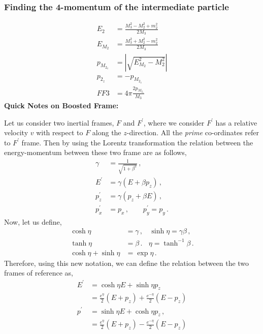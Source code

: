 \documentclass[12pt]{article}
\begin{document}
{\subsubsection{Finding the 4-momentum of the intermediate particle}
{\color{blue}
\begin{align}
    E_2 &= \frac{M_3^2 - M_2^2 + m_2^2}{2M_3} \\
    E_{M_2} &= \frac{M_3^2 + M_2^2 - m_2^2}{2M_3} \\
    p_{M_{2_z}} &= |\sqrt{E_{M_2}^2 - M_2^2} |\\
     p_{2_z} &= -  p_{M_{2_z}} \\
     FF3 &= 4 \pi \frac{2 p_{M_{2_z}}}{M_3}
\end{align}
\textbf{Quick Notes on Boosted Frame:}

Let us consider two inertial frames, $F$ and $F^\prime$, where we consider $F^\prime$ has a relative velocity $v$ with respect to $F$ along the $z$-direction. All the \textit{prime} co-ordinates refer to $F^\prime$ frame. Then by using the Lorentz transformation the relation between the energy-momentum between these two frame are as follows,
\begin{align}
    \gamma &= \frac{1}{\sqrt{1+\beta^2}} \,,\\
    E^\prime &= \gamma (E + \beta p_z) \,, \\
    p^\prime _z &= \gamma (p_z + \beta E)\,, \\
    p^\prime_x &=  p_x \,,~~~~~~~~~ p^\prime_y = p_y \,.
\end{align}
Now, let us define,
\begin{align}
    \cosh{\eta} &= \gamma \,, ~~~~ \sinh{\eta} = \gamma \beta \,,\\
    \tanh{\eta} &= \beta \,. ~~~~ \eta = \tanh^{-1}{\beta} \,.\\
    \cosh{\eta} + \sinh{\eta} &= \exp{\eta} \,.
\end{align}
Therefore, using this new notation, we can define the relation between the two frames of reference as,
\begin{align}
\label{Eq:boosted_energy}
    E^\prime &= \cosh{\eta} E + \sinh{\eta} p_z \, \\
             &= \frac{e^\eta}{2} (E + p_z) + \frac{e^{-\eta}}{2} (E - p_z) \nonumber \\
    p^\prime &= \sinh{\eta} E + \cosh{\eta} p_z \,, \\
    \label{Eq:boosted_momentum}
             &= \frac{e^\eta}{2} (E + p_z) - \frac{e^{-\eta}}{2} (E - p_z)
\end{align}
}}
\end{document}
